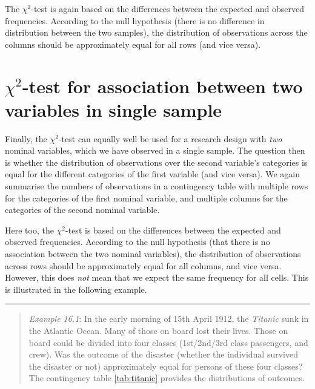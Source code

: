 \documentclass[
]{book}
\begin{document}
The \(\chi^2\)-test is again based on the differences between the expected and
observed frequencies. According to the null hypothesis (there is no difference
in distribution between the two samples), the distribution of observations
across the columns should be approximately equal for all rows
(and vice versa).

\hypertarget{chi2-test-for-association-between-two-variables-in-single-sample}{%
\section{\texorpdfstring{\(\chi^2\)-test for association between two variables in single sample}{\textbackslash chi\^{}2-test for association between two variables in single sample}}\label{chi2-test-for-association-between-two-variables-in-single-sample}}

Finally, the \(\chi^2\)-test can equally well be used for a research design
with \emph{two} nominal variables, which we have observed in a single
sample. The question then is whether the distribution of observations
over the second variable's categories is equal for the different
categories of the first variable (and vice versa). We again summarise
the numbers of observations in a contingency table with multiple rows for
the categories of the first nominal variable, and multiple columns
for the categories of the second nominal variable.

Here too, the \(\chi^2\)-test is based on the differences between the expected and
observed frequencies. According to the null hypothesis (that there is no association
between the two nominal variables), the distribution of observations across
rows should be approximately equal for all columns, and vice versa. However, this
does \emph{not} mean that we expect the same frequency for all cells.
This is illustrated in the following example.

\begin{center}\rule{0.5\linewidth}{0.5pt}\end{center}

\begin{quote}
\emph{Example 16.1}: In the early morning of 15th April 1912, the \emph{Titanic}
sunk in the Atlantic Ocean. Many of those on board lost their lives.
Those on board could be divided into four classes (1st/2nd/3rd class passengers, and crew). Was the outcome of the disaster (whether the individual survived the
disaster or not) approximately equal for persons of these four classes?
The contingency table \ref{tab:titanic} provides the distributions of
outcomes.
\end{quote}
\end{document}
